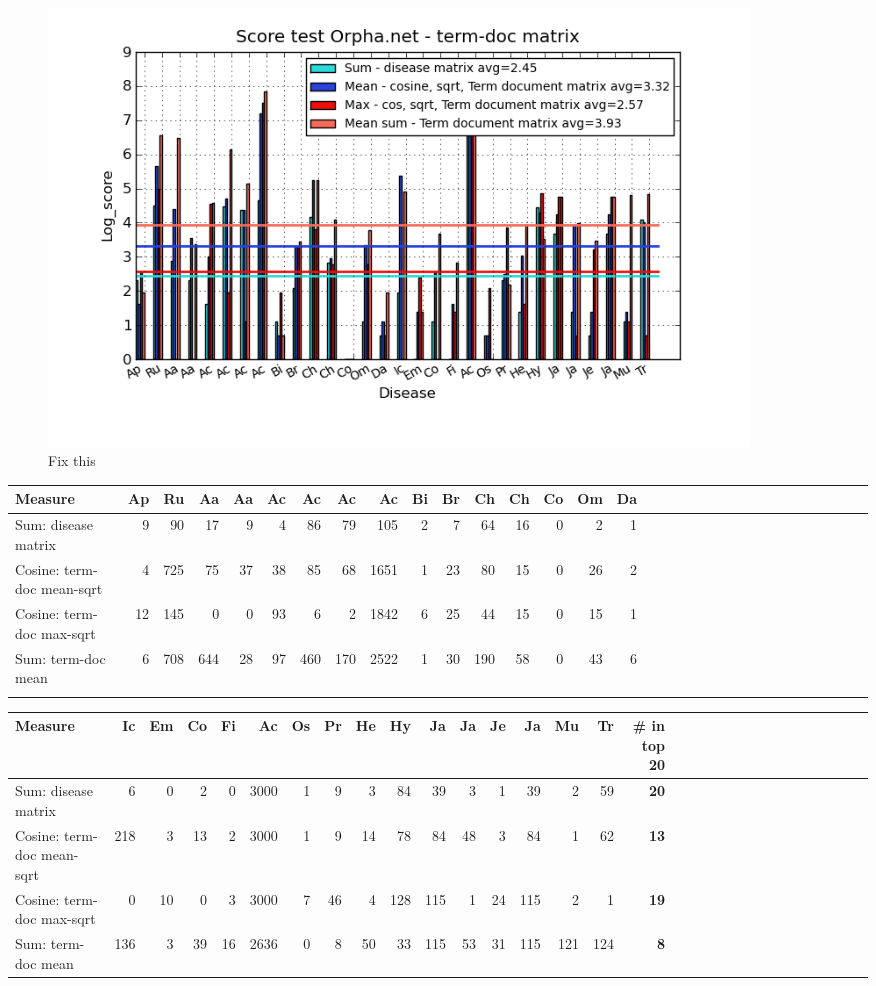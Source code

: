 \begin{figure}[H]
        \begin{center}
          \includegraphics[width=0.9\textwidth]{barcharts/termDoc_orphan_hist_3000_sum_dm_mea_cos_sqrt_td_max_cos_sqrt_td_mea_sum_nn_td.png}
        \end{center}
        \caption{Fix this}
        \label{termDoc_orphan_hist_3000_sum_dm_mea_cos_sqrt_td_max_cos_sqrt_td_mea_sum_nn_td}
\end{figure}

\begin{table}[H]
\begin{tiny}
  \begin{tabular}{|l|r|r|r|r|r|r|r|r|r|r|r|r|r|r|r|r|r|r|r|r|r|r|r|r|r|r|r|r|r|r|r|}
    \hline
    Measure &Ap&Ru&Aa&Aa&Ac&Ac&Ac&Ac&Bi&Br&Ch&Ch&Co&Om&Da\\
    \hline
    Sum: disease matrix &9&90&17&9&4&86&79&105&2&7&64&16&0&2&1\\
    \hline
    Cosine: term-doc mean-sqrt &4&725&75&37&38&85&68&1651&1&23&80&15&0&26&2\\
    \hline
    Cosine: term-doc max-sqrt &12&145&0&0&93&6&2&1842&6&25&44&15&0&15&1\\
    \hline
    Sum: term-doc mean &6&708&644&28&97&460&170&2522&1&30&190&58&0&43&6 \\
    \hline
    \multicolumn{16}{c}{} \\
    \end{tabular}
    \begin{tabular}{|l|r|r|r|r|r|r|r|r|r|r|r|r|r|r|r|r|r|r|r|r|r|r|r|r|r|r|r|r|r|r|}
    \hline
     Measure &Ic&Em&Co&Fi&Ac&Os&Pr&He&Hy&Ja&Ja&Je&Ja&Mu&Tr &\scriptsize{\textbf{\# in top 20}} \\
    \hline
    Sum: disease matrix &6&0&2&0&3000&1&9&3&84&39&3&1&39&2&59 & \scriptsize{\textbf{20}} \\
    \hline
    Cosine: term-doc mean-sqrt &218&3&13&2&3000&1&9&14&78&84&48&3&84&1&62 & \scriptsize{\textbf{13}} \\
    \hline
    Cosine: term-doc max-sqrt &0&10&0&3&3000&7&46&4&128&115&1&24&115&2&1 & \scriptsize{\textbf{19}} \\
    \hline
    Sum: term-doc mean &136&3&39&16&2636&0&8&50&33&115&53&31&115&121&124 & \scriptsize{\textbf{8}} \\
    \hline
  \end{tabular}
\end{tiny}
\end{table}

